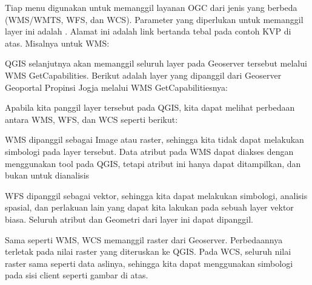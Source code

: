 \documentclass[letterpaper,10pt,english]{sphinxmanual}
\begin{document}

Tiap menu digunakan untuk memanggil layanan OGC dari jenis yang berbeda (WMS/WMTS, WFS, dan WCS). Parameter yang diperlukan untuk memanggil layer ini adalah . Alamat ini adalah link bertanda tebal pada contoh KVP di atas. Misalnya untuk WMS:

\begin{sphinxVerbatim}[commandchars=\\\{\}]
\end{sphinxVerbatim}

QGIS selanjutnya akan memanggil seluruh layer pada Geoserver tersebut melalui WMS GetCapabilities. Berikut adalah layer yang dipanggil dari Geoserver Geoportal Propinsi Jogja melalui WMS GetCapabilitiesnya:


Apabila kita panggil layer tersebut pada QGIS, kita dapat melihat perbedaan antara WMS, WFS, dan WCS seperti berikut:


WMS dipanggil sebagai Image atau raster, sehingga kita tidak dapat melakukan simbologi pada layer tersebut. Data atribut pada WMS dapat diakses dengan menggunakan tool  pada QGIS, tetapi atribut ini hanya dapat ditampilkan, dan bukan untuk dianalisis


WFS dipanggil sebagai vektor, sehingga kita dapat melakukan simbologi, analisis spasial, dan perlakuan lain yang dapat kita lakukan pada sebuah layer vektor biasa. Seluruh atribut dan Geometri dari layer ini dapat dipanggil.


Sama seperti WMS, WCS memanggil raster dari Geoserver. Perbedaannya terletak pada nilai raster yang diteruskan ke QGIS. Pada WCS, seluruh nilai raster sama seperti data aslinya, sehingga kita dapat menggunakan simbologi pada sisi client seperti gambar di atas.
\end{document}
